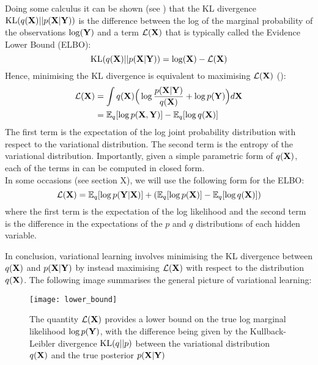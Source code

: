 Doing some calculus it can be shown (see \cite{Bishop2006,Murphy}) that the KL divergence ${\rm KL}(q({\bf X})||p({\bf X}|{\bf Y}))$ is the difference between the log of the marginal probability of the observations $\log({\bf Y})$ and a term $\mathcal{L}({\bf X})$ that is typically called the Evidence Lower Bound (ELBO):
\[
	{\rm KL}(q({\bf X})||p({\bf X}|{\bf Y})) = \log({\bf X}) - \mathcal{L}({\bf X})
\]
Hence, minimising the KL divergence is equivalent to maximising $\mathcal{L}({\bf X})$ ():
\begin{align} \label{eq_elbo1} \begin{split}
	\mathcal{L}({\bf X}) &= \int q({\bf X}) \Big( \log \frac{p({\bf X}|{\bf Y})}{q({\bf X})} + \log p({\bf Y}) \Big) d{\bf X} \\
	&= \mathbb{E}_q [\log p({\bf X},{\bf Y})] - \mathbb{E}_q [\log q({\bf X})]
\end{split} \end{align}
The first term is the expectation of the log joint probability distribution with respect to the variational distribution. The second term is the entropy of the variational distribution.
Importantly, given a simple parametric form of $q({\bf X})$, each of the terms in  can be computed in closed form.\\
In some occasions (see section X), we will use the following form for the ELBO:
\begin{equation} \label{eq_elbo2}
	\mathcal{L}({\bf X}) = \mathbb{E}_q [\log p({\bf Y}|{\bf X})] + (\mathbb{E}_q [\log p({\bf X})] - \mathbb{E}_q [\log q({\bf X})])
\end{equation}
where the first term is the expectation of the log likelihood and the second term is the difference in the expectations of the $p$ and $q$ distributions of each hidden variable.

In conclusion, variational learning involves minimising the KL divergence between $q({\bf X})$ and $p({\bf X}|{\bf Y})$ by instead maximising $\mathcal{L}({\bf X})$ with respect to the distribution $q({\bf X})$. The following image summarises the general picture of variational learning:

\begin{figure}[H]
	\centering
	\texttt{[image: lower\_bound]}
	\caption{The quantity $\mathcal{L}({\bf X})$ provides a lower bound on the true log marginal likelihood $\log p({\bf Y})$, with the difference being given by the Kullback-Leibler divergence ${\rm KL}(q||p)$ between the variational distribution $q({\bf X})$ and the true posterior $p({\bf X}|{\bf Y})$}
	\label{fig:ELBO}
\end{figure}

